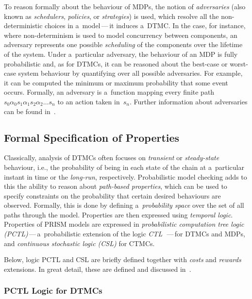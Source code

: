 \documentclass[a4paper, 11pt]{article}
\theoremstyle{definition}
\begin{document}
To reason formally about the behaviour of MDPs, the notion of
\emph{adversaries} (also known as \emph{schedulers}, \emph{policies}, or
\emph{strategies}) is used, which resolve all the non-deterministic choices in
a~model\,---\,it induces a~DTMC. In the case, for instance, where
non-determinism is used to model concurrency between components, an adversary
represents one possible \emph{scheduling} of the components over the
lifetime of the system. Under a~particular adversary, the behaviour of an
MDP is fully probabilistic and, as for DTMCs, it can be reasoned about the
best-case or worst-case system behaviour by quantifying over all possible
adversaries. For example, it can be computed the minimum or maximum
probability that some event occurs. Formally, an adversary is a~function
mapping every finite path $ s_0 \alpha_0 s_1 \alpha_1 s_2 \alpha_2 \ldots
s_n $ to an action taken in~$ s_n $. Further information about adversaries
can be found in~\cite{principlesOfModelCheck, automatedVerForProbSys}.

\subsection{Formal Specification of Properties}
\label{sec:prismLogics}

Classically, analysis of DTMCs often focuses on \emph{transient} or
\emph{steady-state} behaviour, i.e., the probability of being in each
state of the chain at a~particular instant in time or the \emph{long-run},
respectively. Probabilistic model checking adds to this the ability to
reason about \emph{path-based properties}, which can be used to specify
constraints on the probability that certain desired behaviours are
observed. Formally, this is done by defining a~\emph{probability space}
over the set of all paths through the model. Properties are then
expressed using \emph{temporal logic}. Properties of PRISM models are
expressed in \emph{probabilistic computation tree logic
(PCTL)}\,---\,a~probabilistic extension of the logic
\emph{CTL}~\cite{principlesOfModelCheck, handbookOfModelCheck}\,---\,for
DTMCs and MDPs, and \emph{continuous stochastic logic (CSL)} for CTMCs.

Below, logic PCTL and CSL are briefly defined together with \emph{costs}
and \emph{rewards} extensions. In great detail, these are defined and
discussed in~\cite{principlesOfModelCheck, handbookOfModelCheck,
automatedVerForProbSys, stochModelCheck}.

\subsubsection{PCTL Logic for DTMCs}
\end{document}
